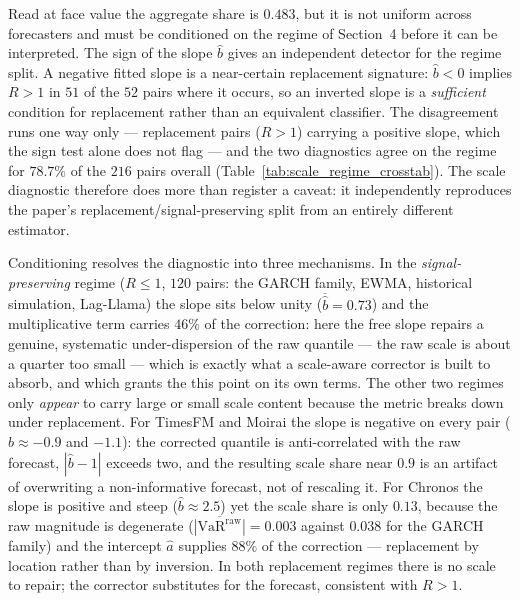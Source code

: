 \documentclass[11pt]{article}
\newcommand{\VaR}{\mathrm{VaR}}
\newcommand{\1}{\boldsymbol{1}}
\begin{document}


Read at face value the aggregate share is $0.483$, but it is not uniform across
forecasters and must be conditioned on the regime of Section~4 before it can be
interpreted. The sign of the slope $\hat b$ gives an independent detector for the regime
split. A negative fitted slope is a near-certain replacement signature:
$\hat b<0$ implies $R>1$ in $51$ of the $52$ pairs where it occurs, so an
inverted slope is a \emph{sufficient} condition for replacement rather than an
equivalent classifier. The disagreement runs one way only --- replacement
pairs ($R>1$) carrying a positive slope, which the sign test alone does not
flag --- and the two diagnostics agree on the regime for $78.7\%$ of the $216$
pairs overall (Table~\ref{tab:scale_regime_crosstab}). The scale diagnostic
therefore does more than register a caveat: it independently reproduces the
paper's replacement/signal-preserving split from an entirely different
estimator.



Conditioning resolves the diagnostic into three mechanisms. In the
\emph{signal-preserving} regime ($R\le1$, $120$ pairs: the GARCH family, EWMA,
historical simulation, Lag-Llama) the slope sits below unity
($\overline{\hat b}=0.73$) and the multiplicative term carries $46\%$ of the
correction: here the free slope repairs a genuine, systematic under-dispersion
of the raw quantile --- the raw scale is about a quarter too small --- which is
exactly what a scale-aware corrector is built to absorb, and which grants the
this point on its own terms. The other two regimes only \emph{appear}
to carry large or small scale content because the metric breaks down under
replacement. For TimesFM and Moirai the slope is negative on every pair
($\hat b\approx-0.9$ and $-1.1$): the corrected quantile is anti-correlated with
the raw forecast, $|\hat b-1|$ exceeds two, and the resulting scale share near
$0.9$ is an artifact of overwriting a non-informative forecast, not of rescaling
it. For Chronos the slope is positive and steep ($\hat b\approx2.5$) yet the
scale share is only $0.13$, because the raw magnitude is degenerate
($\overline{|\VaR^{\mathrm{raw}}|}=0.003$ against $0.038$ for the GARCH family)
and the intercept $\hat a$ supplies $88\%$ of the correction --- replacement by
location rather than by inversion. In both replacement regimes there is no scale
to repair; the corrector substitutes for the forecast, consistent with $R>1$.
\end{document}
